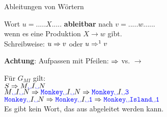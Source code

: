 \begin{frame}{Ableitungen von Wörtern}
	
	\begin{Definition}
		Wort $u = .....X.....$ \textbf{ableitbar} nach $v = ..... w......$ \\
		wenn es eine Produktion $X \to w$ gibt. \\
		Schreibweise: \quad $u \Rightarrow v$ \quad oder \quad $u \Rightarrow^1 v$ \\
	\end{Definition}
	
	\medskip
	\textbf{\alert{Achtung}}: Aufpassen mit Pfeilen: \quad  $\Rightarrow$ vs. $\to$
	
	\pause
	\begin{Beispiel}
		Für $G_{MI}$ gilt: \\
		$S \derives M\word{\sp} I\word{\sp}N$\\
		$ M\word{\sp} I\word{\sp}N \derives \word{Monkey}\word{\sp} I\word{\sp} N \derives \word{Monkey}\word{\sp} I\word{\sp 3}$ \\
		$\word{Monkey}\word{\sp} I\word{\sp} N \derives \word{Monkey}\word{\sp} I\word{\sp 1} \derives \word{Monkey}\word{\sp}\word{Island}\word{\sp 1}$ \\
		Es gibt kein Wort, das aus  abgeleitet werden kann.
	\end{Beispiel}
	
\end{frame}

